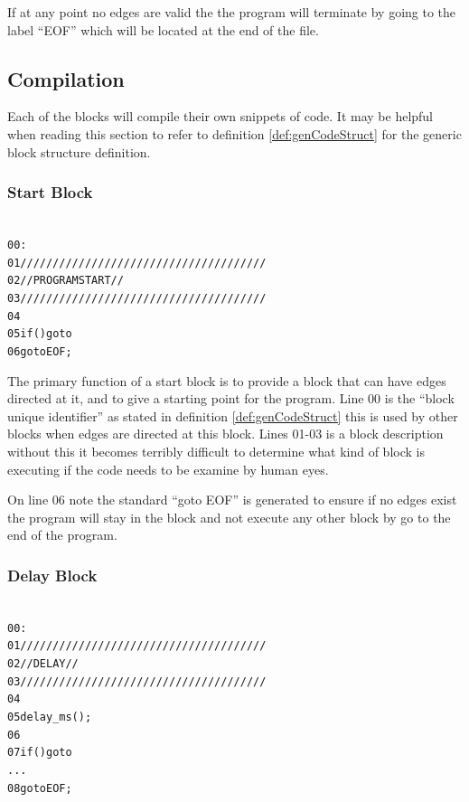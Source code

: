 If at any point no edges are valid the the program will terminate by going to the label ``EOF'' which will be located at the end of the file.


\subsection{Compilation}
\label{compiler}
Each of the blocks will compile their own snippets of code. It may be helpful when reading this section to refer to definition \ref{def:genCodeStruct} for the generic block structure definition.

\subsubsection{Start Block}
\begin{alltt}
\label{def:cmpstartblock}
00 :
01 //////////////////////////////////////
02 //        PROGRAM START             //
03 //////////////////////////////////////
04 
05 if () goto 
06 goto EOF;
\end{alltt}

The primary function of a start block is to provide a block that can have edges directed at it, and to give a starting point for the program. Line 00 is the ``block unique identifier'' as stated in definition \ref{def:genCodeStruct} this is used by other blocks when edges are directed at this block. Lines 01-03 is a block description without this it becomes terribly difficult to determine what kind of block is executing if the code needs to be examine by human eyes. 

On line 06 note the standard ``goto EOF'' is generated to ensure if no edges exist the program will stay in the block and not execute any other block by go to the end of the program.

\subsubsection{Delay Block}
\begin{alltt}
\label{def:cmpdelayblock}
00 :
01 //////////////////////////////////////
02 //        DELAY                     //
03 //////////////////////////////////////
04
05 delay_ms();
06 
07 if () goto 
...
08 goto EOF;
\end{alltt}

